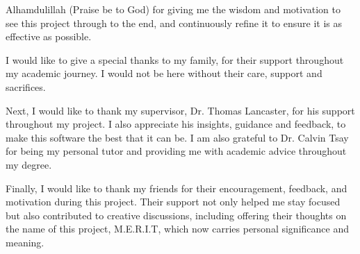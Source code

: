 Alhamdulillah (Praise be to God) for giving me the wisdom and motivation to see this project through to the end, and continuously refine it to ensure it is as effective as possible.

I would like to give a special thanks to my family, for their support throughout my academic journey. I would not be here without their care, support and sacrifices.

Next, I would like to thank my supervisor, Dr. Thomas Lancaster, for his support throughout my project.
I also appreciate his insights, guidance and feedback, to make this software the best that it can be.
I am also grateful to Dr. Calvin Tsay for being my personal tutor and providing me with academic advice throughout my degree.

Finally, I would like to thank my friends for their encouragement, feedback, and motivation during this project. 
Their support not only helped me stay focused but also contributed to creative discussions, including offering their thoughts on the name of this project, M.E.R.I.T, which now carries personal significance and meaning.

